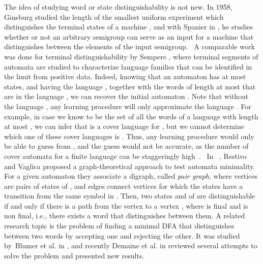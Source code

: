 \documentclass{article}
\newcommand{\dfa}{DFA\xspace}
\begin{document}
The idea of studying word or state distinguishability is not new. 
In 1958, Ginsburg studied the length of the smallest uniform experiment 
which distinguishes the terminal states of a machine 
\cite{ginsburg58:_lengt_of_small_unifor_exper},
and with Spanier in \cite{Ginsburg1960:InputSemigroup}, he studies whether or not 
an arbitrary semigroup can serve as an input for a 
machine that distinguishes between the elements of the input semigroup.
\ A comparable work was done for terminal
distinguishability by Sempere \cite{JoseSempere}, where terminal
 segments of automata are studied to characterize language 
 families that can be identified in the limit from positive data.  
Indeed, knowing that an automaton  has at most 
states, and having the language , together with the
words of length at most  that are in the language , we
can recover the initial automaton .  
Note that without the language , any learning
procedure will only approximate the language .  
For example, in case we know  to be the set of all the
words of a language  with length at most , we can infer that
 is a cover language for , but we cannot determine which one of
these cover languages is . 
Thus, any learning procedure would only be able to guess  from ,
and the guess would not be accurate, as the number of cover automata
for a finite language can be staggeringly
high~\cite{campeanu13:_cover_languag_and_implem,CezarAndreiCount}. 
\ In ~\cite{restivo12:_graph_theor_approac_to_autom_minim}, 
Restivo and
Vaglica proposed a graph-theoretical approach to test automata
minimality. For  a given automaton  they associate 
a digraph, called \emph{pair graph}, where vertices are pairs
 of states of , and  edges connect vertices for which
the states have a transition from the same symbol in . Then, two states
 and  of  are distinguishable if and only if there is a path
from the vertex  to a vertex , where  is
final and   is non final, i.e., there exists a word that distinguishes
between them. 
A related research topic is the problem of finding a minimal \dfa that
 distinguishes between two words by accepting one and rejecting the other.
It was studied by~Blumer et
al. in \cite{blumer85:_small_autom_recog_subwor_of_text}, and recently 
Demaine et al. in \cite{demaine11:_remar_separ_words} 
reviewed several attempts to solve the problem and presented new results. 
\end{document}

